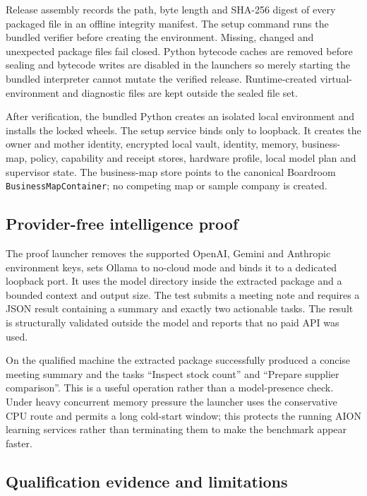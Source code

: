 Release assembly records the path, byte length and SHA-256 digest of every packaged file in an
offline integrity manifest. The setup command runs the bundled verifier before creating the
environment. Missing, changed and unexpected package files fail closed. Python bytecode caches
are removed before sealing and bytecode writes are disabled in the launchers so merely starting
the bundled interpreter cannot mutate the verified release. Runtime-created virtual-environment
and diagnostic files are kept outside the sealed file set.

After verification, the bundled Python creates an isolated local environment and installs the
locked wheels. The setup service binds only to loopback. It creates the owner and mother
identity, encrypted local vault, identity, memory, business-map, policy, capability and receipt
stores, hardware profile, local model plan and supervisor state. The business-map store points to
the canonical Boardroom \texttt{BusinessMapContainer}; no competing map or sample company is
created.

\subsection{Provider-free intelligence proof}

The proof launcher removes the supported OpenAI, Gemini and Anthropic environment keys, sets
Ollama to no-cloud mode and binds it to a dedicated loopback port. It uses the model directory
inside the extracted package and a bounded context and output size. The test submits a meeting
note and requires a JSON result containing a summary and exactly two actionable tasks. The result
is structurally validated outside the model and reports that no paid API was used.

On the qualified machine the extracted package successfully produced a concise meeting summary
and the tasks ``Inspect stock count'' and ``Prepare supplier comparison''. This is a useful
operation rather than a model-presence check. Under heavy concurrent memory pressure the launcher
uses the conservative CPU route and permits a long cold-start window; this protects the running
AION learning services rather than terminating them to make the benchmark appear faster.

\subsection{Qualification evidence and limitations}

